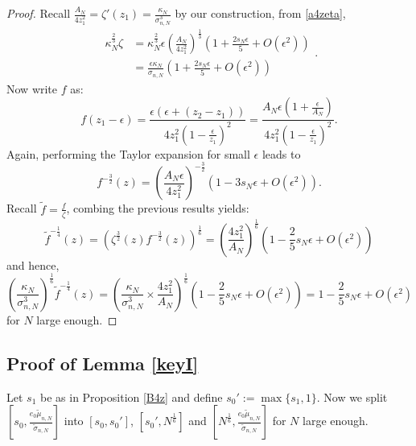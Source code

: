 \documentclass[11pt]{article}
\numberwithin{equation}{section}%
\numberwithin{theorem}{section}
\begin{document}
\begin{proof}
Recall $\frac{A_N}{4z_1^2}=\zeta'(z_1)=\frac{\kappa_N}{\sigma_{n,N}^3}$ by our construction, from \eqref{a4zeta},
\begin{equation*}
    \begin{split}
        \kappa_N^{\frac{2}{3}}\zeta&=\kappa_N^{\frac{2}{3}}\epsilon\left(\frac{A_N}{4z_1^2}\right)^\frac{1}{3}\left(1+\frac{2s_N\epsilon}{5}+O(\epsilon^2)\right)\\
        &=\frac{\epsilon\kappa_N}{\sigma_{n,N}}\left(1+\frac{2s_N\epsilon}{5}+O(\epsilon^2)\right)
    \end{split}.
\end{equation*}
Now write $f$ as:
\begin{equation*}
    f(z_1-\epsilon)=\frac{\epsilon(\epsilon+(z_2-z_1))}{4z_1^2(1-\frac{\epsilon}{z_1})^2}=\frac{A_N\epsilon(1+\frac{\epsilon}{A_N})}{4z_1^2(1-\frac{\epsilon}{z_1})^2}.
\end{equation*}
Again, performing the Taylor expansion for small $\epsilon$ leads to
\begin{equation*}
    f^{-\frac{3}{2}}(z)=\left(\frac{A_N\epsilon}{4z_1^2}\right)^{-\frac{3}{2}}\left(1-3s_N\epsilon+O(\epsilon^2)\right).
\end{equation*}
Recall $\tilde{f}=\frac{f}{\zeta}$, combing the previous results yields:
\begin{equation*}
    \tilde{f}^{-\frac{1}{4}}(z)=\left(\zeta^{\frac{3}{2}}(z)f^{-\frac{3}{2}}(z)\right)^{\frac{1}{6}}=\left(\frac{4z_1^2}{A_N}\right)^{\frac{1}{6}}\left(1-\frac{2}{5}s_N\epsilon+O(\epsilon^2)\right)
\end{equation*}
and hence,
\begin{equation*}
    \left(\frac{\kappa_N}{\sigma^3_{n,N}}\right)^{\frac{1}{6}}\tilde{f}^{-\frac{1}{4}}(z)=\left(\frac{\kappa_N}{\sigma^3_{n,N}}\times\frac{4z_1^2}{A_N}\right)^{\frac{1}{6}}\left(1-\frac{2}{5}s_N\epsilon+O(\epsilon^2)\right)=1-\frac{2}{5}s_N\epsilon+O(\epsilon^2)
\end{equation*}
for $N$ large enough.\end{proof}

\subsection{Proof of Lemma \ref{keyI}}\label{P4I1}
    Let $s_1$ be as in Proposition \ref{B4z} and define $s_0':=\max\{s_1,1\}$. Now we split $\left[s_0,\frac{e_0\tilde\mu_{n,N}}{\tilde\sigma_{n,N}}\right]$ into $[s_0,s_0']$, $\left[s_0',N^{\frac{1}{6}}\right]$ and $\left[N^\frac{1}{6},\frac{e_0\tilde\mu_{n,N}}{\tilde\sigma_{n,N}}\right]$ for $N$ large enough.
\end{document}
